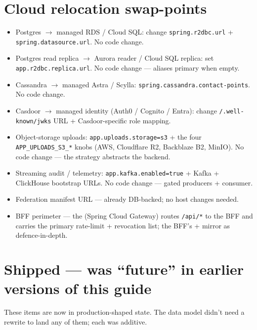 \documentclass[11pt,a4paper,openany]{book}
\begin{document}
\chapter{Cloud relocation swap-points}
\begin{itemize}
  \item Postgres $\rightarrow$ managed RDS / Cloud SQL: change
        \texttt{spring.r2dbc.url} + \texttt{spring.datasource.url}.
        No code change.
  \item Postgres read replica $\rightarrow$ Aurora reader / Cloud SQL
        replica: set \texttt{app.r2dbc.replica.url}. No code change
        ---  aliases primary when
        empty.
  \item Cassandra $\rightarrow$ managed Astra / Scylla:
        \texttt{spring.cassandra.contact-points}. No code change.
  \item Casdoor $\rightarrow$ managed identity (Auth0 / Cognito /
        Entra): change \texttt{/.well-known/jwks} URL +
        Casdoor-specific role mapping.
  \item Object-storage uploads: \texttt{app.uploads.storage=s3} +
        the four \texttt{APP\_UPLOADS\_S3\_*} knobs (AWS, Cloudflare
        R2, Backblaze B2, MinIO). No code change --- the
         strategy abstracts the backend.
  \item Streaming audit / telemetry: \texttt{app.kafka.enabled=true}
        + Kafka + ClickHouse bootstrap URLs. No code change ---
        gated producers + consumer.
  \item Federation manifest URL --- already DB-backed; no host
        changes needed.
  \item BFF perimeter --- the 
        (Spring Cloud Gateway) routes \texttt{/api/*} to the BFF and
        carries the primary rate-limit + revocation list; the BFF's
         + 
        mirror as defence-in-depth.
\end{itemize}

\chapter{Shipped --- was ``future'' in earlier versions of this guide}
These items are now in production-shaped state. The data model
didn't need a rewrite to land any of them; each was additive.
\end{document}
